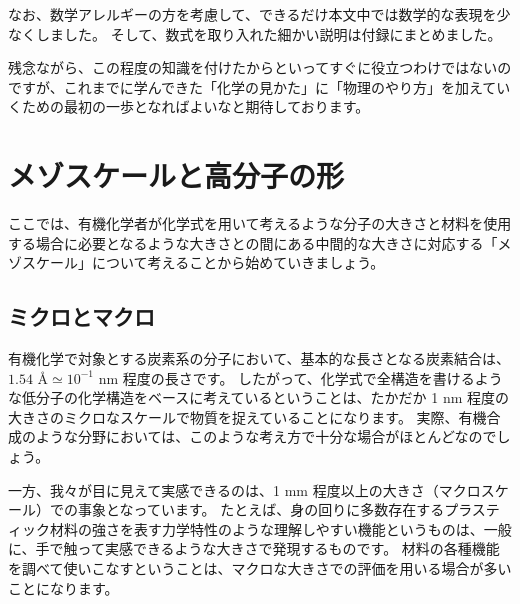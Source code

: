 \documentclass[uplatex,dvipdfmx,a4paper,11pt, titlepage]{jsarticle}
\begin{document}
なお、数学アレルギーの方を考慮して、できるだけ本文中では数学的な表現を少なくしました。
そして、数式を取り入れた細かい説明は付録にまとめました。

残念ながら、この程度の知識を付けたからといってすぐに役立つわけではないのですが、これまでに学んできた「化学の見かた」に「物理のやり方」を加えていくための最初の一歩となればよいなと期待しております。


\thispagestyle{empty}
\newpage

\setcounter{page}{1}
\section{メゾスケールと高分子の形}


ここでは、有機化学者が化学式を用いて考えるような分子の大きさと材料を使用する場合に必要となるような大きさとの間にある中間的な大きさに対応する「メゾスケール」について考えることから始めていきましょう。

\subsection{ミクロとマクロ}

有機化学で対象とする炭素系の分子において、基本的な長さとなる炭素結合は、$1.54$ \AA $\simeq 10^{-1}$ nm 程度の長さです。
したがって、化学式で全構造を書けるような低分子の化学構造をベースに考えているということは、たかだか 1 nm 程度の大きさのミクロなスケールで物質を捉えていることになります。
実際、有機合成のような分野においては、このような考え方で十分な場合がほとんどなのでしょう。

一方、我々が目に見えて実感できるのは、1 mm 程度以上の大きさ（マクロスケール）での事象となっています。
たとえば、身の回りに多数存在するプラスティック材料の強さを表す力学特性のような理解しやすい機能というものは、一般に、手で触って実感できるような大きさで発現するものです。
材料の各種機能を調べて使いこなすということは、マクロな大きさでの評価を用いる場合が多いことになります。
\end{document}
